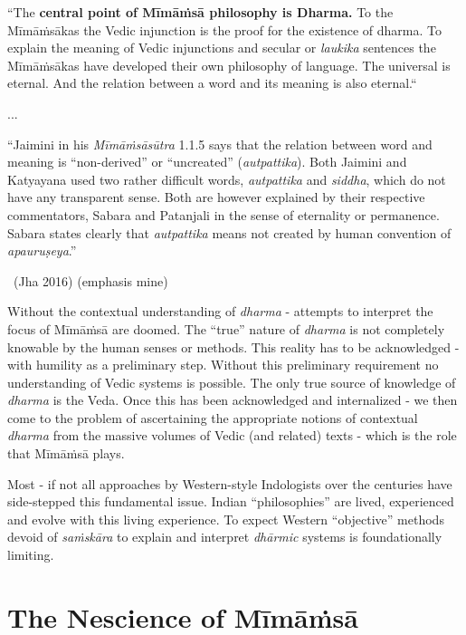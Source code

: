 \begin{myquote}
“The \textbf{central point of Mīmāṁsā philosophy is Dharma.} To the Mīmāṁsākas the Vedic injunction is the proof for the existence of dharma. To explain the meaning of Vedic injunctions and secular or \textit{laukika} sentences the Mīmāṁsākas have developed their own philosophy of language. The universal is eternal. And the relation between a word and its meaning is also eternal.“
\end{myquote}

\begin{myquote}
...
\end{myquote}

\begin{myquote}
“Jaimini in his \textit{Mīmāṁsāsūtra} 1.1.5 says that the relation between word and meaning is “non-derived” or “uncreated” (\textit{autpattika}). Both Jaimini and Katyayana used two rather difficult words, \textit{autpattika} and \textit{siddha}, which do not have any transparent sense. Both are however explained by their respective commentators, Sabara and Patanjali in the sense of eternality or permanence. Sabara states clearly that \textit{autpattika} means not created by human convention of \textit{apauruṣeya}.”

~\hfill (Jha 2016) (emphasis mine)
\end{myquote}

Without the contextual understanding of \textit{dharma }- attempts to interpret the focus of Mīmāṁsā are doomed. The “true” nature of \textit{dharma} is not completely knowable by the human senses or methods. This reality has to be acknowledged - with humility as a preliminary step. Without this preliminary requirement no understanding of Vedic systems is possible. The only true source of knowledge of \textit{dharma} is the Veda. Once this has been acknowledged and internalized - we then come to the problem of ascertaining the appropriate notions of contextual \textit{dharma} from the massive volumes of Vedic (and related) texts - which is the role that Mīmāṁsā plays.

Most - if not all approaches by Western-style Indologists over the centuries have side-stepped this fundamental issue. Indian “philosophies” are lived, experienced and evolve with this living experience. To expect Western “objective” methods devoid of \textit{saṁskāra} to explain and interpret \textit{dhārmic} systems is foundationally limiting.


\section*{The Nescience of Mīmāṁsā}

